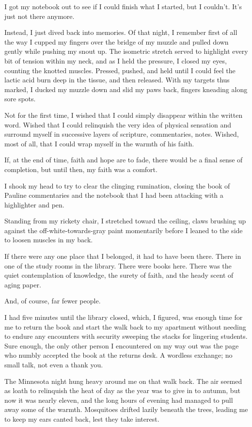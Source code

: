 I got my notebook out to see if I could finish what I started, but I couldn't. It's just not there anymore.

Instead, I just dived back into memories. Of that night, I remember first of all the way I cupped my fingers over the bridge of my muzzle and pulled down gently while pushing my snout up. The isometric stretch served to highlight every bit of tension within my neck, and as I held the pressure, I closed my eyes, counting the knotted muscles. Pressed, pushed, and held until I could feel the lactic acid burn deep in the tissue, and then released. With my targets thus marked, I ducked my muzzle down and slid my paws back, fingers kneading along sore spots.

Not for the first time, I wished that I could simply disappear within the written word. Wished that I could relinquish the very idea of physical sensation and surround myself in successive layers of scripture, commentaries, notes. Wished, most of all, that I could wrap myself in the warmth of his faith.

If, at the end of time, faith and hope are to fade, there would be a final sense of completion, but until then, my faith was a comfort.

I shook my head to try to clear the clinging rumination, closing the book of Pauline commentaries and the notebook that I had been attacking with a highlighter and pen.

Standing from my rickety chair, I stretched toward the ceiling, claws brushing up against the off-white-towards-gray paint momentarily before I leaned to the side to loosen muscles in my back.

If there were any one place that I belonged, it had to have been there. There in one of the study rooms in the library. There were books here. There was the quiet contemplation of knowledge, the surety of faith, and the heady scent of aging paper.

And, of course, far fewer people.

I had five minutes until the library closed, which, I figured, was enough time for me to return the book and start the walk back to my apartment without needing to endure any encounters with security sweeping the stacks for lingering students. Sure enough, the only other person I encountered on my way out was the page who numbly accepted the book at the returns desk. A wordless exchange; no small talk, not even a thank you.

The Minnesota night hung heavy around me on that walk back. The air seemed as loath to relinquish the heat of day as the year was to give in to autumn, but now it was nearly eleven, and the long hours of evening had managed to pull away some of the warmth. Mosquitoes drifted lazily beneath the trees, leading me to keep my ears canted back, lest they take interest.

